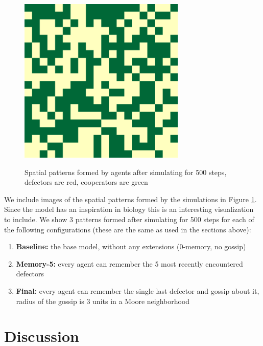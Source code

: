 \documentclass[english]{article}
\begin{document}
\begin{figure}[!hb]
{    \includegraphics[width=\textwidth/4]{spatial-memory1+gossip1+range3-C.pdf}
  }
  \caption{Spatial patterns formed by agents after simulating for 500 steps, defectors are red, cooperators are green}
  \label{fig:spatial}
\end{figure}

We include images of the spatial patterns formed by the simulations in Figure \ref{fig:spatial}.
Since the model has an inspiration in biology this is an interesting visualization to include.
We show 3 patterns formed after simulating for 500 steps for each of the following configurations
(these are the same as used in the sections above):
\begin{enumerate}
  \setlength\itemsep{0em}
  \setlength\parskip{0cm}
  \item
    \textbf{Baseline:} the base model, without any extensions (0-memory, no gossip)
  \item
    \textbf{Memory-5:} every agent can remember the 5 most recently encountered defectors
  \item
    \textbf{Final:} every agent can remember the single last defector and gossip about it,
    radius of the gossip is 3 units in a Moore neighborhood
\end{enumerate}



\section{Discussion}
\end{document}
